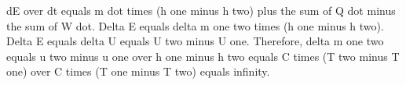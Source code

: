 dE over dt equals m dot times (h one minus h two) plus the sum of Q dot minus the sum of W dot. Delta E equals delta m one two times (h one minus h two). Delta E equals delta U equals U two minus U one. Therefore, delta m one two equals u two minus u one over h one minus h two equals C times (T two minus T one) over C times (T one minus T two) equals infinity.